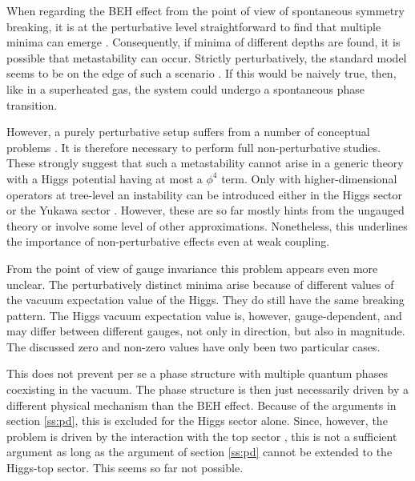 \documentclass[final,12pt]{article}
\newcommand*{\1}{1\!\!\!\bot}
\begin{document}
When regarding the BEH effect from the point of view of spontaneous symmetry breaking, it is at the perturbative level straightforward to find that multiple minima can emerge \cite{Sher:1988mj,EliasMiro:2011aa,Alekhin:2012py}. Consequently, if minima of different depths are found, it is possible that metastability can occur. Strictly perturbatively, the standard model seems to be on the edge of such a scenario \cite{Alekhin:2012py,Buttazzo:2013uya,Gabrielli:2013hma,Bednyakov:2015sca,Iacobellis:2016eof}. If this would be naively true, then, like in a superheated gas, the system could undergo a spontaneous phase transition.

However, a purely perturbative setup suffers from a number of conceptual problems \cite{Holland:2003jr,Branchina:2005tu,Branchina:2008pc,Bulava:2012rb,Branchina:2014rva,Eichhorn:2015kea,Borchardt:2016xju}. It is therefore necessary to perform full non-perturbative studies. These strongly suggest that such a metastability cannot arise \cite{Bulava:2012rb,Eichhorn:2015kea,Borchardt:2016xju} in a generic theory with a Higgs potential having at most a $\phi^4$ term. Only with higher-dimensional operators at tree-level an instability can be introduced either in the Higgs sector \cite{Chu:2015nha,Eichhorn:2015kea,Sondenheimer:2017jin} or the Yukawa sector \cite{Gies:2017zwf}. However, these are so far mostly hints from the ungauged theory or involve some level of other approximations. Nonetheless, this underlines the importance of non-perturbative effects even at weak coupling.

From the point of view of gauge invariance this problem appears even more unclear. The perturbatively distinct minima arise because of different values of the vacuum expectation value of the Higgs. They do still have the same breaking pattern. The Higgs vacuum expectation value is, however, gauge-dependent, and may differ between different gauges, not only in direction, but also in magnitude. The discussed zero and non-zero values have only been two particular cases.

This does not prevent per se a phase structure with multiple quantum phases coexisting in the vacuum. The phase structure is then just necessarily driven by a different physical mechanism than the BEH effect. Because of the arguments in section \ref{ss:pd}, this is excluded for the Higgs sector alone. Since, however, the problem is driven by the interaction with the top sector \cite{EliasMiro:2011aa,Alekhin:2012py}, this is not a sufficient argument as long as the argument of section \ref{ss:pd} cannot be extended to the Higgs-top sector. This seems so far not possible.
\end{document}
